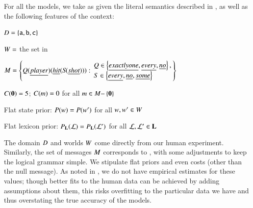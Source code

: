 \documentclass[leqno,12pt]{article}
\begin{document}
For all the models, we take as given the literal semantics described
in , as well as the following features of the
context:
%
\begin{examples}
\item\label{expmod}
  \begin{examples}
  \item $D = \left\{ \texttt{a}, \texttt{b}, \texttt{c} \right\}$
  \item $W = $ the set in 
  \item\label{expformulae} $\Messages =
    \setlength{\arraycolsep}{2pt}
    \set{
      Q(\word{player})(\word{hit}(S\negthinspace(\word{shot}))) :
      \begin{array}{l}        
        Q \in \set{\word{exactly one}, \word{every}, \word{no}}, \\
        S \in \set{\word{every}, \word{no}, \word{some}}
      \end{array}}$
  \item $C(\mathbf{0}) = 5$; $C(m) = 0$ for all $m \in M{-}\left\{ \mathbf{0} \right\}$  
  \item Flat state prior: $P(w) = P(w')$ for all $w, w' \in W$
  \item Flat lexicon prior: $P_{\mathbf{L}}(\mathcal{L}) = P_{\mathbf{L}}(\mathcal{L}')$ for all $\mathcal{L}, \mathcal{L}' \in \mathbf{L}$
  \end{examples}
\end{examples}

The domain $D$ and worlds $W$ come directly from our human
experiment. Similarly, the set of messages $M$ corresponds to
, with some adjustments to keep the logical grammar
simple. We stipulate flat priors and even costs (other than the null
message). As noted in , we do not have empirical
estimates for these values; though better fits to the human data can
be achieved by adding assumptions about them, this risks overfitting
to the particular data we have and thus overstating the true accuracy
of the models.
\end{document}
